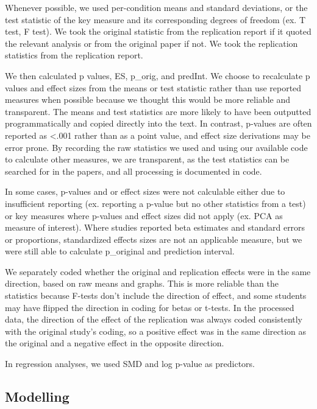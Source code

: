 \documentclass[
  english,
  a4paper,
]{article}
\begin{document}
Whenever possible, we used per-condition means and standard deviations, or the test statistic of the key measure and its corresponding degrees of freedom (ex. T test, F test). We took the original statistic from the replication report if it quoted the relevant analysis or from the original paper if not. We took the replication statistics from the replication report.

We then calculated p values, ES, p\_orig, and predInt. We choose to recalculate p values and effect sizes from the means or test statistic rather than use reported measures when possible because we thought this would be more reliable and transparent. The means and test statistics are more likely to have been outputted programmatically and copied directly into the text. In contrast, p-values are often reported as \textless.001 rather than as a point value, and effect size derivations may be error prone. By recording the raw statistics we used and using our available code to calculate other measures, we are transparent, as the test statistics can be searched for in the papers, and all processing is documented in code.

In some cases, p-values and or effect sizes were not calculable either due to insufficient reporting (ex. reporting a p-value but no other statistics from a test) or key measures where p-values and effect sizes did not apply (ex. PCA as measure of interest). Where studies reported beta estimates and standard errors or proportions, standardized effects sizes are not an applicable measure, but we were still able to calculate p\_original and prediction interval.

We separately coded whether the original and replication effects were in the same direction, based on raw means and graphs. This is more reliable than the statistics because F-tests don't include the direction of effect, and some students may have flipped the direction in coding for betas or t-tests. In the processed data, the direction of the effect of the replication was always coded consistently with the original study's coding, so a positive effect was in the same direction as the original and a negative effect in the opposite direction.

In regression analyses, we used SMD and log p-value as predictors.

\hypertarget{modelling}{%
\subsection{Modelling}\label{modelling}}
\end{document}
